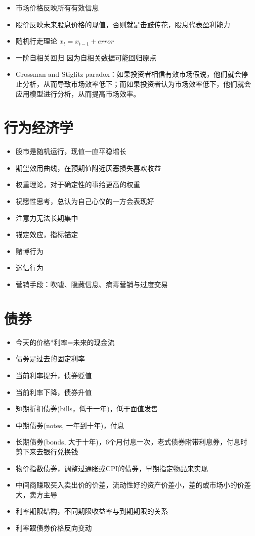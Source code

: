 \documentclass[
]{book}
\providecommand{\tightlist}{%
  \setlength{\itemsep}{0pt}\setlength{\parskip}{0pt}}
\begin{document}
\begin{itemize}
\tightlist
\item
  市场价格反映所有有效信息
\item
  股价反映未来股息价格的现值，否则就是击鼓传花，股息代表盈利能力
\item
  随机行走理论 \(x_t = x_{t-1}+error\)
\item
  一阶自相关回归 因为自相关数据可能回归原点
\item
  Grossman and Stiglitz paradox：如果投资者相信有效市场假说，他们就会停止分析，从而导致市场效率低下；而如果投资者认为市场效率低下，他们就会应用模型进行分析，从而提高市场效率。
\end{itemize}

\hypertarget{ux884cux4e3aux7ecfux6d4eux5b66}{%
\section{行为经济学}\label{ux884cux4e3aux7ecfux6d4eux5b66}}

\begin{itemize}
\tightlist
\item
  股市是随机运行，现值一直平稳增长
\item
  期望效用曲线，在预期值附近厌恶损失喜欢收益
\item
  权重理论，对于确定性的事给更高的权重
\item
  祝愿性思考，总认为自己心仪的一方会表现好
\item
  注意力无法长期集中
\item
  锚定效应，指标锚定
\item
  赌博行为
\item
  迷信行为
\item
  营销手段：吹嘘、隐藏信息、病毒营销与过度交易
\end{itemize}

\hypertarget{ux503aux5238}{%
\section{债券}\label{ux503aux5238}}

\begin{itemize}
\tightlist
\item
  今天的价格*利率=未来的现金流
\item
  债券是过去的固定利率
\item
  当前利率提升，债券贬值
\item
  当前利率下降，债券升值
\item
  短期折扣债券(bills，低于一年)，低于面值发售
\item
  中期债券(notes, 一年到十年)，付息
\item
  长期债券(bonds, 大于十年)，6个月付息一次，老式债券附带利息券，付息时剪下来去银行兑换钱
\item
  物价指数债券，调整过通胀或CPI的债券，早期指定物品来实现
\item
  中间商赚取买入卖出价的价差，流动性好的资产价差小，差的或市场小的价差大，卖方主导
\item
  利率期限结构，不同期限收益率与到期期限的关系
\item
  利率跟债券价格反向变动
\end{itemize}
\end{document}
